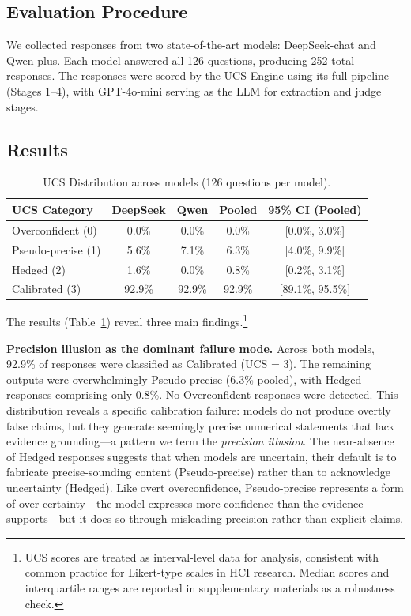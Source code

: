 \documentclass[manuscript, review, anonymous]{acmart}
\begin{document}
\subsection{Evaluation Procedure}

We collected responses from two state-of-the-art models: DeepSeek-chat and Qwen-plus. Each model answered all 126 questions, producing 252 total responses. The responses were scored by the UCS Engine using its full pipeline (Stages 1--4), with GPT-4o-mini serving as the LLM for extraction and judge stages. %

\subsection{Results}

\begin{table}[ht]
\centering
\caption{UCS Distribution across models (126 questions per model).}
\label{tab:ucs_distribution}
\begin{tabular}{lcccc}
\toprule
UCS Category & DeepSeek & Qwen & Pooled & 95\% CI (Pooled) \\
\midrule
Overconfident (0)    & 0.0\% & 0.0\% & 0.0\% & [0.0\%, 3.0\%] \\
Pseudo-precise (1)   & 5.6\% & 7.1\% & 6.3\% & [4.0\%, 9.9\%] \\
Hedged (2)           & 1.6\% & 0.0\% & 0.8\% & [0.2\%, 3.1\%] \\
Calibrated (3)       & 92.9\% & 92.9\% & 92.9\% & [89.1\%, 95.5\%] \\
\bottomrule
\end{tabular}
\end{table}

The results (Table~\ref{tab:ucs_distribution}) reveal three main findings.\footnote{UCS scores are treated as interval-level data for analysis, consistent with common practice for Likert-type scales in HCI research. Median scores and interquartile ranges are reported in supplementary materials as a robustness check.}

\textbf{Precision illusion as the dominant failure mode.} Across both models, 92.9\% of responses were classified as Calibrated (UCS = 3). The remaining outputs were overwhelmingly Pseudo-precise (6.3\% pooled), with Hedged responses comprising only 0.8\%. No Overconfident responses were detected. This distribution reveals a specific calibration failure: models do not produce overtly false claims, but they generate seemingly precise numerical statements that lack evidence grounding---a pattern we term the \emph{precision illusion}. The near-absence of Hedged responses suggests that when models are uncertain, their default is to fabricate precise-sounding content (Pseudo-precise) rather than to acknowledge uncertainty (Hedged). Like overt overconfidence, Pseudo-precise represents a form of over-certainty—the model expresses more confidence than the evidence supports—but it does so through misleading precision rather than explicit claims.
\end{document}
